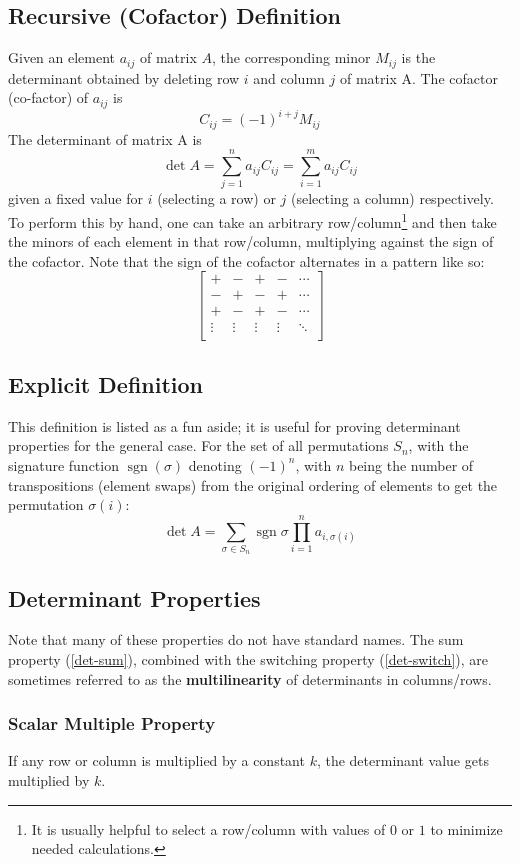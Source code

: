 \documentclass{article}
\DeclareMathOperator{\sgn}{sgn}
\begin{document}
\subsection{Recursive (Cofactor) Definition}
Given an element $a_{ij}$ of matrix $A$, the corresponding minor $M_{ij}$ is the determinant obtained by deleting row $i$ and column $j$ of matrix A.
The cofactor (co-factor) of $a_{ij}$ is $$C_{ij} = (-1)^{i+j}M_{ij}$$
The determinant of matrix A is $$\det{A} = \sum_{j=1}^n a_{ij}C_{ij} = \sum_{i=1}^m a_{ij}C_{ij}$$ given a fixed value for $i$ (selecting a row) or $j$ (selecting a column) respectively.
To perform this by hand, one can take an arbitrary row/column\footnote{It is usually helpful to select a row/column with values of $0$ or $1$ to minimize needed calculations.} and then take the minors of each element in that row/column, multiplying against the sign of the cofactor. Note that the sign of the cofactor alternates in a pattern like so:
$$\begin{bmatrix}
    + & - & + & - & \cdots \\
    - & + & - & + & \cdots \\
    + & - & + & - & \cdots \\
    \vdots & \vdots & \vdots & \vdots & \ddots \\
\end{bmatrix}$$

\subsection{Explicit Definition}
This definition is listed as a fun aside; it is useful for proving determinant properties for the general case.
For the set of all permutations $S_n$, with the signature function $\sgn(\sigma)$ denoting $(-1)^n$, with $n$ being the number of transpositions (element swaps) from the original ordering of elements to get the permutation $\sigma(i)$:
$$\det{A} = \sum_{\sigma \in S_n} \sgn{\sigma} \prod_{i=1}^n a_{i,\sigma(i)}$$

\subsection{Determinant Properties}
Note that many of these properties do not have standard names.
The sum property (\ref{det-sum}), combined with the switching property (\ref{det-switch}), are sometimes referred to as the \textbf{multilinearity} of determinants in columns/rows.

\subsubsection{Scalar Multiple Property}
If any row or column is multiplied by a constant $k$, the determinant value gets multiplied by $k$.
\end{document}
